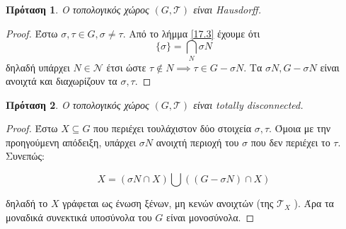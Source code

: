 \documentclass[oneside,a4paper]{article}
\newtheorem{prop}{Πρόταση}
\newcommand {\tl}{\textlatin}
\begin{document}
\begin{prop} Ο τοπολογικός χώρος $(G,\mathcal{T})$ είναι \tl{Hausdorff}.
\end{prop}
\begin{proof}


Έστω $\sigma , \tau \in G, \sigma \neq \tau$.  Από το λήμμα \ref{17.3} έχουμε ότι 
$$\{\sigma \} = \bigcap_N \sigma N$$
δηλαδή υπάρχει $N \in \mathcal{N}$ έτσι ώστε $\tau \notin N \implies \tau \in G-\sigma N$. Τα $\sigma N , G-\sigma N$ είναι ανοιχτά και διαχωρίζουν τα $\sigma , \tau$.
\end{proof} 
\begin{prop} Ο τοπολογικός χώρος $(G, \mathcal{T})$ είναι \tl{totally disconnected}.
\end{prop}
\begin{proof} Έστω $X\subseteq G$ που περιέχει τουλάχιστον δύο στοιχεία $\sigma ,\tau$. Όμοια με την προηγούμενη απόδειξη, υπάρχει $\sigma N$ ανοιχτή περιοχή του $\sigma$ που δεν περιέχει το $\tau$. Συνεπώς:

$$X = \left( \sigma N \cap X \right) \bigcup \left( \left( G-\sigma N\right) \cap X\right)$$

\noindent δηλαδή το $X$ γράφεται ως ένωση ξένων, μη κενών ανοιχτών (της $\mathcal{T}_X$ ). Άρα τα μοναδικά συνεκτικά υποσύνολα του $G$ είναι μονοσύνολα.
\end{proof}
\end{document}
